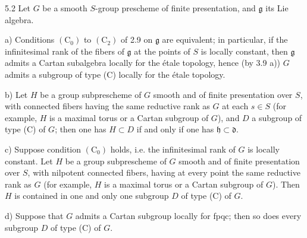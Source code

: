 \begin{corollary}{5.2}\label{XIV.5.2}
Let $G$ be a
smooth $S$-group
prescheme of
finite presentation,
and $\mathfrak g$
its Lie algebra.

\noindent a) Conditions
$(\mathrm C_0)$ to
$(\mathrm C_2)$ of
2.9 on
$\mathfrak g$ are
equivalent; in
particular, if
the infinitesimal
rank of the
fibers of
$\mathfrak g$ at
the points of
$S$ is locally
constant, then
$\mathfrak g$
admits a Cartan
subalgebra locally
for the \'etale
topology, hence
(by 3.9 a))
$G$ admits a
subgroup of type
(C) locally for
the \'etale
topology.

\noindent b) Let
$H$ be a group
subprescheme of
$G$ smooth and
of finite
presentation over
$S$, with
connected fibers
having the same
reductive rank
as $G$ at each
$s\in S$ (for
example, $H$ is
a maximal torus
or a Cartan
subgroup of $G$),
and $D$ a
subgroup of type
(C) of $G$;
then one has
$H\subset D$
if and only if
one has
$\mathfrak h\subset\mathfrak d$.

\noindent c) Suppose
condition
$(\mathrm C_0)$
holds, i.e. the
infinitesimal rank
of $G$ is locally
constant. Let $H$
be a group
subprescheme of
$G$ smooth and
of finite
presentation over
$S$, with
nilpotent connected
fibers, having
at every point
the same reductive
rank as $G$
(for example,
$H$ is a maximal
torus or a Cartan
subgroup of $G$).
Then $H$ is
contained in one
and only one
subgroup $D$ of
type (C) of $G$.

\noindent d) Suppose
that $G$ admits
a Cartan subgroup
locally for fpqc;
then so does
every subgroup
$D$ of type
(C) of $G$.
\end{corollary}
